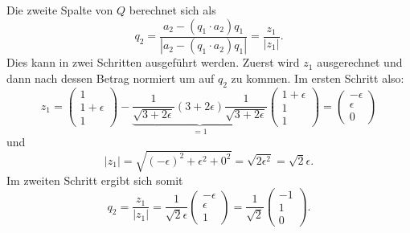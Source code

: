 Die zweite Spalte von $Q$ berechnet sich als
\begin{equation*}
q_2=\frac{a_2-(q_1\cdot a_2)q_1}{|a_2-(q_1\cdot a_2)q_1|}=\frac{z_1}{|z_1|}.
\end{equation*} 
Dies kann in zwei Schritten ausgeführt werden. Zuerst wird $z_1$ ausgerechnet und dann nach dessen Betrag normiert um auf $q_2$ zu kommen.
Im ersten Schritt also:
\begin{equation*}
z_1=
\begin{pmatrix}
1\\
1+\epsilon\\
1
\end{pmatrix}-\underbrace{\frac{1}{\sqrt{3+2\epsilon}}(3+2\epsilon)\frac{1}{\sqrt{3+2\epsilon}}}_{\displaystyle=1}
\begin{pmatrix}
1+\epsilon\\
1\\
1
\end{pmatrix}=
\begin{pmatrix}
-\epsilon\\
\epsilon\\
0
\end{pmatrix}
\end{equation*}
und
\begin{equation*}
|z_1|=\sqrt{(-\epsilon)^2+\epsilon^2+0^2}=\sqrt{2\epsilon^2}=\sqrt{2}\epsilon.
\end{equation*}
Im zweiten Schritt ergibt sich somit
\begin{equation*}
q_2=\frac{z_1}{|z_1|}=\frac{1}{\sqrt{2}\epsilon}
\begin{pmatrix}
-\epsilon\\
\epsilon\\
1
\end{pmatrix}=
\frac{1}{\sqrt{2}}
\begin{pmatrix}
-1\\
1\\
0
\end{pmatrix}.
\end{equation*}

